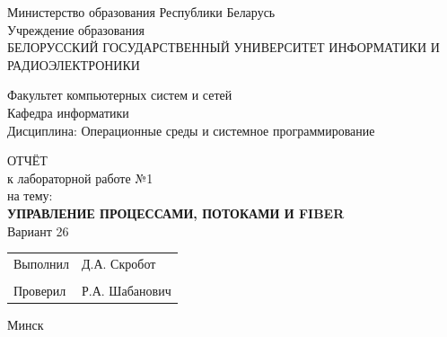\newpage
\thispagestyle{empty}

\begin{center}
  Министерство образования Республики Беларусь \\
  Учреждение образования \\
  \uppercase{Белорусский государственный университет информатики и радиоэлектроники}
\end{center}

\begingroup
\raggedright
Факультет компьютерных систем и сетей \\
Кафедра информатики \\
Дисциплина: Операционные среды и системное программирование
\endgroup

\vspace{2\baselineskip}

\begin{center}
  \uppercase{Отчёт} \\
  к лабораторной работе №1 \\
  на тему: \\
  \vspace{\baselineskip}
  \uppercase{\textbf{Управление процессами, потоками и Fiber}} \\
  \vspace{1\baselineskip}
  Вариант 26
\end{center}

\vspace{5\baselineskip}

\begin{center}
  \begin{tabularx}{\textwidth}{ X l }
    Выполнил      \hfill & Д.А. Скробот \hspace{2em} \\
                         &                           \\
    Проверил             & Р.А. Шабанович            \\   
  \end{tabularx}
\end{center}

\vspace{\fill}

\centerline{Минск \the\year{}}